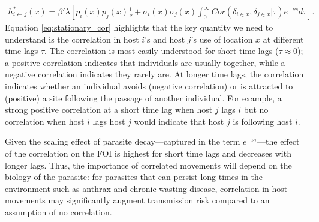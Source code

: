 \documentclass[letterpaper]{article}
\begin{document}
\begin{equation}
    \begin{aligned}
    h^*_{i \leftarrow j}(x) = \beta' \lambda \left[ p_i(x)p_j(x) \frac{1}{\nu} + \sigma_i(x) \sigma_j(x) \int_{0}^{\infty} Cor(\delta_{i \in x}, \delta_{j \in x} | \tau) e^{-\nu s} d\tau\right].
    \end{aligned}
    \label{eq:stationary_cor}
\end{equation}
Equation \ref{eq:stationary_cor} highlights that the key quantity we need to understand is the correlation in host $i$'s and host $j$'s use of location $x$ at different time lags $\tau$. The correlation is most easily understood for short time lags ($\tau\approx0$); a positive correlation indicates that individuals are usually together, while a negative correlation indicates they rarely are. At longer time lags, the correlation indicates whether an individual avoids (negative correlation) or is attracted to (positive) a site following the passage of another individual. For example, a strong positive correlation at a short time lag when host $j$ lags $i$ but no correlation when host $i$ lags host $j$ would indicate that host $j$ is following host $i$. 

Given the scaling effect of parasite decay---captured in the term $e^{-\nu \tau}$---the effect of the correlation on the FOI is highest for short time lags and decreases with longer lags. Thus, the importance of correlated movements will depend on the biology of the parasite: for parasites that can persist long times in the environment such as anthrax and chronic wasting disease, correlation in host movements may significantly augment transmission risk compared to an assumption of no correlation.

\end{document}
